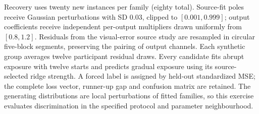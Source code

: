 \documentclass[11pt,a4paper]{article}
\begin{document}
Recovery uses twenty new instances per family (eighty total). Source-fit poles receive Gaussian perturbations with SD 0.03, clipped to $[0.001,0.999]$; output coefficients receive independent per-output multipliers drawn uniformly from $[0.8,1.2]$. Residuals from the visual-error source study are resampled in circular five-block segments, preserving the pairing of output channels. Each synthetic group averages twelve participant residual draws. Every candidate fits abrupt exposure with twelve starts and predicts gradual exposure using its source-selected ridge strength. A forced label is assigned by held-out standardized MSE; the complete loss vector, runner-up gap and confusion matrix are retained. The generating distributions are local perturbations of fitted families, so this exercise evaluates discrimination in the specified protocol and parameter neighbourhood.
\end{document}

